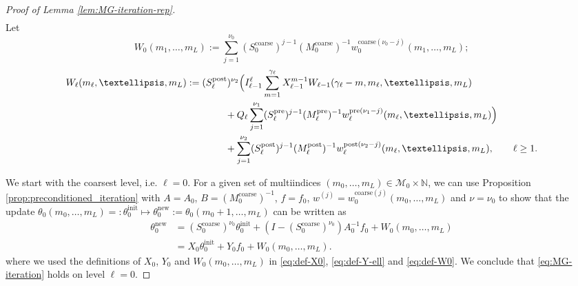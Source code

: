 \documentclass[11pt,english]{article}
\theoremstyle{plain}
\theoremstyle{plain}
\theoremstyle{plain}
\theoremstyle{plain}
\numberwithin{equation}{section}
\newcommand*{\id}{I}
\begin{document}
\begin{proof}[Proof of Lemma \ref{lem:MG-iteration-rep}]
\begin{equation}
\begin{aligned}
		\end{aligned}\label{eqn:w_sample_distributions}
	\end{equation} Let
	\begin{equation}
		W_{0}(m_{1},\dots,m_{L}):=\sum_{j=1}^{\nu_{0}}(S_{0}^{\mathrm{coarse}})^{j-1}(M^{\mathrm{coarse}}_{0})^{-1}w_{0}^{\mathrm{coarse}(\nu_0-j)}(m_{1},\dots,m_{L});\label{eq:def-W0}
	\end{equation}
	\begin{equation}
		\begin{aligned}
			W_{\ell}(m_{\ell},\dots,m_{L}) & :=(S^{\mathrm{post}}_{\ell})^{\nu_{2}}\Bigl(I_{\ell-1}^{\ell}\sum_{m=1}^{\gamma_{\ell}}X_{\ell-1}^{m-1}W_{\ell-1}(\gamma_\ell-m,m_{\ell},\dots,m_{L})                                                            \\
			                               & \qquad\qquad+Q_{\ell}\sum_{j=1}^{\nu_{1}}(S^{\mathrm{pre}}_{\ell})^{j-1}(M^{\mathrm{pre}}_{\ell})^{-1}w_{\ell}^{\mathrm{pre}(\nu_1-j)}(m_{\ell},\dots,m_{L})\Bigr)                                               \\
			                               & \qquad\qquad+\sum_{j=1}^{\nu_{2}}(S_{\ell}^{\mathrm{post}})^{j-1}(M_{\ell}^{\mathrm{post}})^{-1}w_{\ell}^{\mathrm{post}(\nu_2-j)}(m_{\ell},\dots,m_{L}),\qquad\text{\ensuremath{\ell\geq1}}.\label{eq:def-W_ell}
		\end{aligned}
	\end{equation}


	We
	start with the coarsest level, i.e. $\ell=0$. For a given set of multiindices $(m_0,\dots,m_L)\in\mathscr{M}_0\times \mathbb{N}$, we can use Proposition \ref{prop:preconditioned_iteration} with $A=A_0$, $B=(M_0^{\mathrm{coarse}})^{-1}$, $f=f_0$, $w^{(j)}=w_0^{\mathrm{coarse}(j)}(m_0,\dots,m_L)$ and $\nu=\nu_0$ to show that the update $\theta_0(m_0,\dots,m_L)=:\theta_0^{\mathrm{init}}\mapsto \theta_0^{\mathrm{new}}:=\theta_0(m_0+1,\dots,m_L)$ can be written as
	\begin{equation}
		\begin{aligned}
			\theta_0^{\mathrm{new}} & = (S_0^{\mathrm{coarse}})^{\nu_0}\theta_0^{\mathrm{init}} + (\id-(S_0^{\mathrm{coarse}})^{\nu_0})A_0^{-1} f_0 + W_0(m_0,\dots,m_L) \\
			                        & = X_0\theta_0^{\mathrm{init}} + Y_0 f_0 + W_0(m_0,\dots,m_L).\label{eqn:theta_new_0}
		\end{aligned}
	\end{equation}
	where we used the definitions of $X_0$, $Y_0$ and $W_0(m_0,\dots,m_L)$ in \eqref{eq:def-X0}, \eqref{eq:def-Y-ell} and \eqref{eq:def-W0}. We conclude that \eqref{eq:MG-iteration} holds on level $\ell=0$.


\end{proof}
\end{document}
